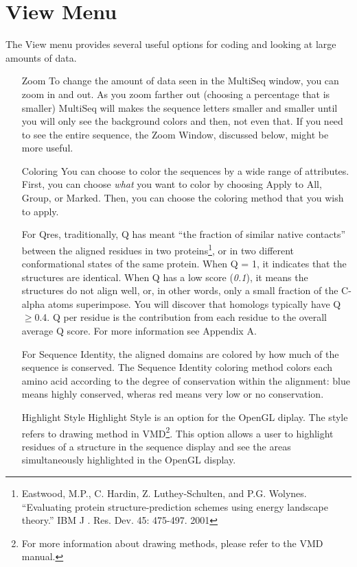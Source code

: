 \label {unit4}


\section{View Menu}

The \textsf{View} menu provides several useful options for coding and
looking at large amounts of data.

\begin{itemize}
\item[Zoom] To change the amount of data seen in the MultiSeq window,
you can zoom in and out.  As you zoom farther out (choosing a percentage
that is smaller) MultiSeq will makes the sequence letters smaller and
smaller until you will only see the background colors and then, not even
that.  If you need to see the entire sequence, the \textsf{Zoom Window},
discussed below, might be more useful.
\item [Coloring]
You can choose to color the sequences by a wide range of attributes.
First, you can choose \emph{what} you want to color by choosing
\textsf{Apply to All}, \textsf{Group}, or \textsf{Marked}.  Then, you
can choose the coloring method that you wish to apply.  

For \textsf{Qres}, traditionally, Q has meant ``the fraction of
     similar native contacts'' between the aligned residues in two
     proteins\footnote {Eastwood, M.P., C. Hardin, Z. Luthey-Schulten,
     and P.G. Wolynes. ``Evaluating protein structure-prediction schemes
     using energy landscape theory.''  IBM J . Res. Dev. 45: 475-497.
     2001}, or in two different conformational states of the same
     protein.  When Q = 1, it indicates that the structures are
     identical.  When Q has a low score (\textit{0.1}), it means the
     structures do not align well, or, in other words, only a small
     fraction of the C-alpha atoms superimpose.  You will discover that
     homologs typically have Q$\ge$0.4.  Q per residue is the
     contribution from each residue to the overall average Q score.  For
     more information see Appendix A.

For \textsf{Sequence Identity}, the aligned domains are colored by how
much of the sequence is conserved. The \textsf{Sequence Identity}
coloring method colors each amino acid according to the degree of
conservation within the alignment: blue means highly conserved, wheras
red means very low or no conservation.

\item[Highlight Style]
\textsf{Highlight Style} is an option for the OpenGL diplay.  The style
refers to drawing method in VMD\footnote {For more information about
drawing methods, please refer to the VMD manual.}.  This option allows a
user to highlight residues of a structure in the sequence display and
see the areas simultaneously highlighted in the OpenGL display.


\end{itemize}
